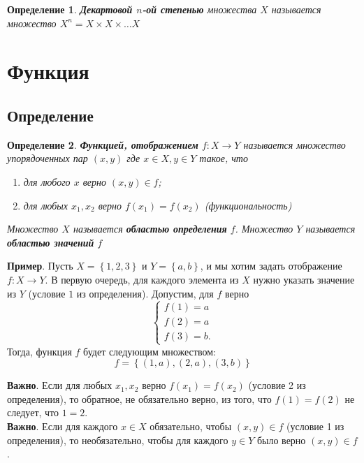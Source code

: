 \documentclass[]{article}
\newtheorem{definition}{Определение}
\begin{document}
	\begin{definition}
	\textbf{Декартовой $n$-ой степенью} множества $X$ называется множество $X^n=X\times X\times \ldots X$ 
	\end{definition}
	\section{Функция}
	\subsection{Определение}
	\begin{definition}
		\textbf{Функцией, отображением} $f:X\rightarrow Y$ называется множество  упорядоченных пар $(x,y)$ где $x\in X, y\in Y$ такое, что 
		\begin{enumerate}
			\item для любого $x$ верно  $(x,y)\in f$; 
			\item для любых $x_1, x_2$ верно  $f(x_1)=f(x_2)$
			(функциональность)
		\end{enumerate}
		Множество $X$ называется \textbf{областью определения} $f$.
		Множество $Y$ называется \textbf{областью значений} $f$
	\end{definition}
	\textbf{Пример}. Пусть $X=\left\{1,2,3\right\}$ и $Y=\left\{a,b\right\}$, и мы хотим задать отображение $f:X\rightarrow Y$. В первую очередь, для каждого элемента из $X$ нужно указать значение из $Y$ (условие $1$ из определения). Допустим, для $f$ верно
	\begin{equation}
	\begin{cases}
	f(1)=a
	\\
	f(2)=a
	\\
	f(3)=b.
\end{cases}
	\end{equation}
Тогда, функция $f$ будет следующим множеством:
\begin{equation}
	f=\left\{(1,a),(2,a),(3,b)\right\}
\end{equation}

\textbf{Важно}. Если для любых $x_1, x_2$ верно $f(x_1)=f(x_2)$ (условие 2 из определения), то обратное, не обязательно верно, из того, что $f(1)=f(2)$ не следует, что $1=2$.
\\

\textbf{Важно}. Если для каждого $x\in X$ обязательно, чтобы $(x,y)\in f$ (условие 1 из определения), то необязательно, чтобы для каждого $y\in Y$ было верно $(x,y)\in f$.
\\
\end{document}
